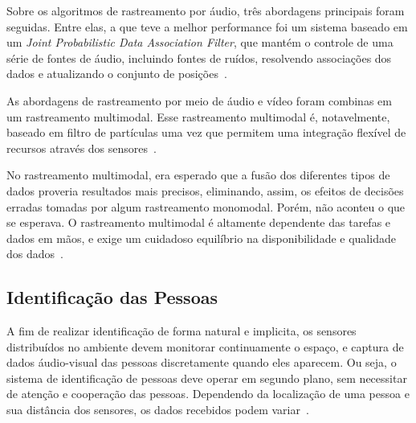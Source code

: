 	

Sobre os algoritmos de rastreamento por áudio, três abordagens principais foram seguidas. Entre elas, a que teve a melhor performance foi um sistema baseado em um \textit{Joint Probabilistic Data Association Filter}, que mantém o controle de uma série de fontes de áudio, incluindo fontes de ruídos, resolvendo associações dos dados e atualizando o conjunto de posições~\cite{chil}.

As abordagens de rastreamento por meio de áudio e vídeo foram combinas em um rastreamento multimodal. Esse rastreamento multimodal é, notavelmente, baseado em filtro de partículas uma vez que permitem uma integração flexível de recursos através dos sensores~\cite{chil}.

No rastreamento multimodal, era esperado que a fusão dos diferentes tipos de dados proveria resultados mais precisos, eliminando, assim, os efeitos de decisões erradas tomadas por algum rastreamento monomodal. Porém, não aconteu o que se esperava. O rastreamento multimodal é altamente dependente das tarefas e dados em mãos, e exige um cuidadoso equilíbrio na disponibilidade e qualidade dos dados~\cite{chil}.

\subsection{Identificação das Pessoas}


A fim de realizar identificação de forma natural e implicita, os sensores distribuídos no ambiente devem monitorar continuamente o espaço, e captura de dados áudio-visual das pessoas discretamente quando eles aparecem. Ou seja, o sistema de identificação de pessoas
deve operar em segundo plano, sem necessitar de atenção e cooperação das pessoas. Dependendo da localização de uma pessoa e sua distância dos sensores, os dados recebidos podem variar~\cite{chil}. 

